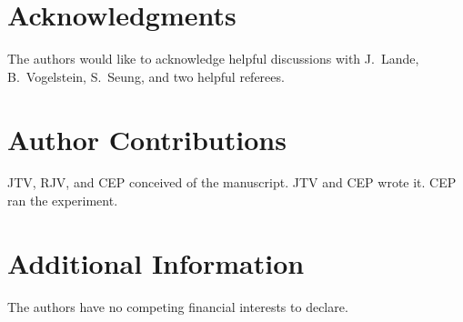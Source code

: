 \documentclass{article}
\begin{document}
\clearpage



\section*{Acknowledgments}

The authors would like to acknowledge helpful discussions with J.~Lande, B.~Vogelstein, S.~Seung, and two helpful referees.

\section*{Author Contributions}

JTV, RJV, and CEP conceived of the manuscript.  JTV and CEP wrote it.  CEP ran the experiment.

\section*{Additional Information}

The authors have no competing financial interests to declare.
\end{document}
